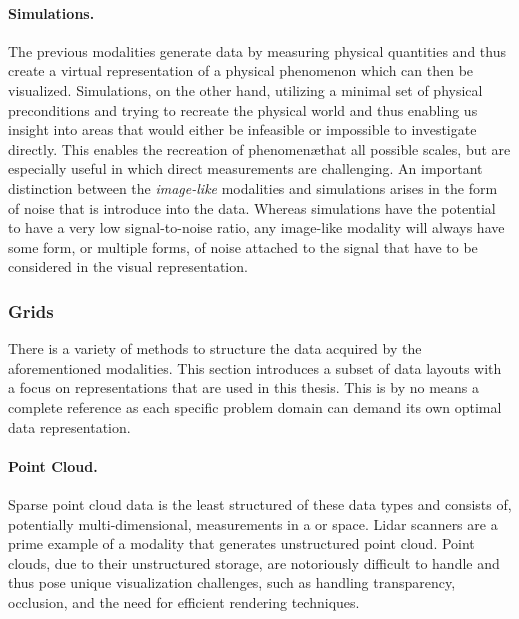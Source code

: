 \paragraph{Simulations. }  The previous modalities generate data by measuring physical quantities and thus create a virtual representation of a physical phenomenon which can then be visualized.  Simulations, on the other hand, utilizing a minimal set of physical preconditions and trying to recreate the physical world and thus enabling us insight into areas that would either be infeasible or impossible to investigate directly.  
This enables the recreation of phenomen\ae that all possible scales, but are especially useful in which direct measurements are challenging.  An important distinction between the \emph{image-like} modalities and simulations arises in the form of noise that is introduce into the data.  Whereas simulations have the potential to have a very low signal-to-noise ratio, any image-like modality will always have some form, or multiple forms, of noise attached to the signal that have to be considered in the visual representation.

\subsubsection{Grids} \label{cha:intro:vp:da:grids}
There is a variety of methods to structure the data acquired by the aforementioned modalities.  This section introduces a subset of data layouts with a focus on representations that are used in this thesis.  This is by no means a complete reference as each specific problem domain can demand its own optimal data representation.

\paragraph{Point Cloud. }  Sparse point cloud data is the least structured of these data types and consists of, potentially multi-dimensional, measurements in a  or  space.  Lidar scanners are a prime example of a modality that generates unstructured point cloud.  Point clouds, due to their unstructured storage, are notoriously difficult to handle and thus pose unique visualization challenges, such as handling transparency, occlusion, and the need for efficient rendering techniques.

